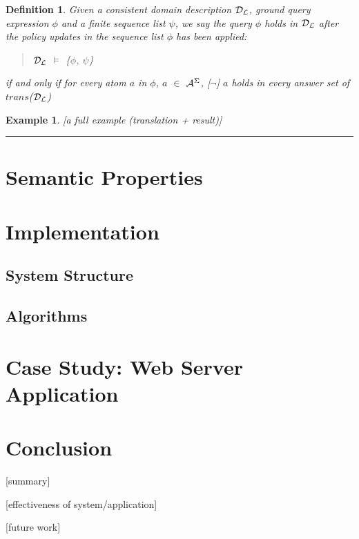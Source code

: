 \documentclass[10pt, twocolumn]{article}
\newtheorem{definition}{Definition}
\newtheorem{examp}{Example}
\newenvironment{example}{\begin{examp}\rm}{\rule{2mm}{2mm}\end{examp}}
\begin{document}
        \begin{definition}
          Given a consistent domain description ${\cal D}_{\cal L}$, ground
          query expression $\phi$ and a finite sequence list $\psi$, we say the
          query $\phi$ holds in ${\cal D}_{\cal L}$ after the policy updates
          in the sequence list $\phi$ has been applied:

          \begin{quote}
            ${\cal D}_{\cal L}$ $\models$ \{$\phi$, $\psi$\}
          \end{quote}

          \noindent if and only if for every atom $a$ in $\phi$, $a$ $\in$
          ${\cal A}^{\Sigma}$, [$\lnot$] $a$ holds in every answer set of
          $trans$(${\cal D}_{\cal L}$)
        \end{definition}

    \begin{example}
      [a full example (translation + result)]

    \end{example}

  \section{Semantic Properties}

  \section{Implementation}

    \subsection{System Structure}

    \subsection{Algorithms}

  \section{Case Study: Web Server Application}

  \section{Conclusion}

    [summary]

    [effectiveness of system/application]

    [future work]
\end{document}
